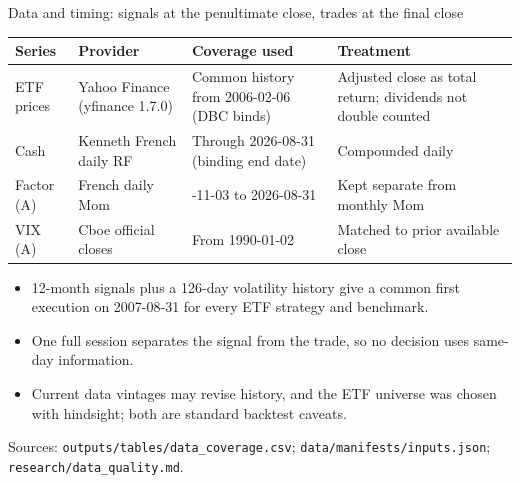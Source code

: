 \documentclass[aspectratio=169,11pt]{beamer}
\newcommand{\src}[1]{\par\vfill{\scriptsize\color{muted}\sloppy #1\par}\vskip0.05cm}
\begin{document}
\begin{frame}[t]{Data and timing: signals at the penultimate close, trades at the final close}
\footnotesize
\begin{tabularx}{\textwidth}{@{}>{\raggedright\arraybackslash}p{2.1cm}>{\raggedright\arraybackslash}p{3.6cm}>{\raggedright\arraybackslash}p{3.7cm}>{\raggedright\arraybackslash}X@{}}
\toprule
Series & Provider & Coverage used & Treatment \\
\midrule
8 ETF prices & Yahoo Finance (yfinance 1.7.0) & Common history from 2006-02-06 (DBC binds) & Adjusted close as total return; dividends not double counted \\
Cash & Kenneth French daily RF & Through 2026-08-31 (binding end date) & Compounded daily \\
Factor (A) & French daily Mom & 1926-11-03 to 2026-08-31 & Kept separate from monthly Mom \\
VIX (A) & Cboe official closes & From 1990-01-02 & Matched to prior available close \\
\bottomrule
\end{tabularx}

\vskip0.3cm
\begin{center}
\end{center}

\vskip0.05cm
\begin{itemize}\itemsep1pt
\item 12-month signals plus a 126-day volatility history give a common first execution on 2007-08-31 for every ETF strategy and benchmark.
\item One full session separates the signal from the trade, so no decision uses same-day information.
\item Current data vintages may revise history, and the ETF universe was chosen with hindsight; both are standard backtest caveats.
\end{itemize}
\src{Sources: \texttt{outputs/tables/data\_coverage.csv}; \texttt{data/manifests/inputs.json}; \texttt{research/data\_quality.md}.}
\end{frame}
\end{document}
